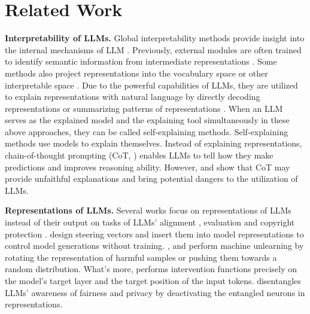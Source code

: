 \section{Related Work}
\textbf{Interpretability of LLMs.} Global interpretability methods provide insight into the internal mechanisms of LLM \cite{liu2023towards, zhou2024explaining, ren2024identifying, ren2024towards, dang2024explainable}. Previously, external modules are often trained to identify semantic information from intermediate representations \cite{liu2025latent,liu2024efficient}. Some methods also project representations into the vocabulary space \cite{Nostalgebraist2020} or other interpretable space \cite{gao2024scaling,lieberum2024gemma}. Due to the powerful capabilities of LLMs, they are utilized to explain representations with natural language by directly decoding representations \cite{chen2024selfie,ghandeharioun2024patchscope} or summarizing patterns of representations \cite{bills2023language}. When an LLM serves as the explained model and the explaining tool simultaneously in these above approaches, they can be called self-explaining methods. Self-explaining methods use models to explain themselves. Instead of explaining representations, chain-of-thought prompting (CoT, \citet{nye2021show,wei2022chain}) enables LLMs to tell how they make predictions and improves reasoning ability. However, \citet{huang2023can} and \citet{turpin2024language} show that CoT may provide unfaithful explanations and bring potential dangers to the utilization of LLMs.

\textbf{Representations of LLMs.} Several works focus on representations of LLMs instead of their output on tasks of LLMs' alignment \cite{li2024open,yin2024lofit,qian2024towards,zhang2024real,zhang2024better}, evaluation \cite{wei2024diff,azaria2023internal,xu2024good,azaria2023internal,orgad2024llms} and copyright protection \cite{zhang2024reef,sevastjanova2022lmfingerprints,yang2024fingerprint}. \citet{li2024inference} design steering vectors and insert them into model representations to control model generations without training. \citet{rosati2024representation}, \citet{zou2024improving} and \citet{li2024wmdp} perform machine unlearning by rotating the representation of harmful samples or pushing them towards a random distribution. What's more, \citet{wu2024reft} performs intervention functions precisely on the model's target layer and the target position of the input tokens. \citet{qian2024dean} disentangles LLMs’ awareness of fairness and privacy by deactivating the entangled neurons in representations.

